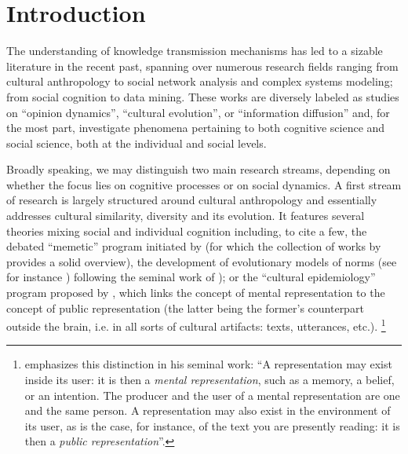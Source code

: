 \section{Introduction} %

The understanding of knowledge transmission mechanisms has led to a sizable literature in the recent past, spanning over numerous research fields ranging from cultural anthropology to social network analysis and complex systems modeling; from social cognition to data mining. These works are diversely labeled as studies on ``opinion dynamics'', ``cultural evolution'', or ``information diffusion'' and, for the most part, investigate phenomena pertaining to both cognitive science and social science, both at the individual and social levels.

Broadly speaking, we may distinguish two main research streams, depending on whether the focus lies on cognitive processes or on social dynamics. A first stream of research is largely structured around cultural anthropology and essentially addresses cultural similarity, diversity and its evolution. It features several theories mixing social and individual cognition including, to cite a few, the debated ``memetic'' program initiated by \citet{Dawkins76} (for which the collection of works by \citet{Aunger00} provides a solid overview), the development of evolutionary models of norms (see for instance \citet{Ehrlich05}) following the seminal work of \citet{Boyd85}); or the ``cultural epidemiology'' program proposed by \citet{sper:expl}, which links the concept of mental representation to the concept of public representation (the latter being the former's counterpart outside the brain, \hbox{i.e.} in all sorts of cultural artifacts: texts, utterances, etc.).
\footnote{\citet{sper:expl} emphasizes this distinction in his seminal work: ``A representation may exist inside its user: it is then a \emph{mental representation}, such as a memory, a belief, or an intention. The producer and the user of a mental representation are one and the same person. A representation may also exist in the environment of its user, as is the case, for instance, of the text you are presently reading: it is then a \emph{public representation}''.}

